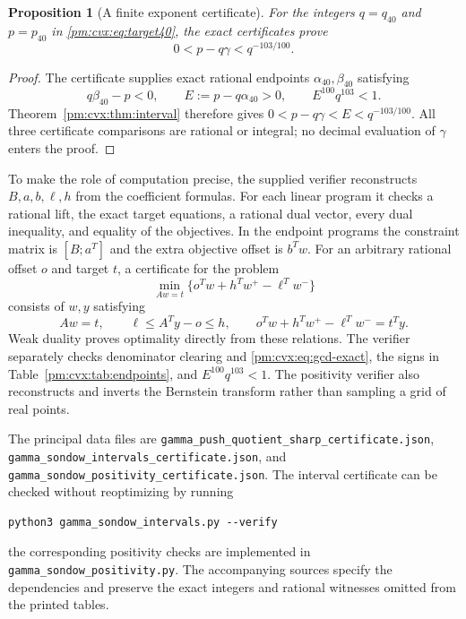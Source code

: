 \documentclass[11pt,a4paper]{article}
\newtheorem{proposition}[theorem]{Proposition}
\theoremstyle{definition}
\theoremstyle{remark}
\numberwithin{equation}{section}
\begin{document}
\begin{proposition}[A finite exponent certificate]
\label{pm:cvx:prop:finite-exponent}
For the integers $q=q_{40}$ and $p=p_{40}$ in
\eqref{pm:cvx:eq:target40}, the exact certificates prove
\begin{equation}\label{pm:cvx:eq:103}
 0<p-q\gamma<q^{-103/100}.
\end{equation}
\end{proposition}
\begin{proof}
The certificate supplies exact rational endpoints
$\alpha_{40},\beta_{40}$ satisfying
\[
 q\beta_{40}-p<0,\qquad
 E:=p-q\alpha_{40}>0,\qquad E^{100}q^{103}<1.
\]
Theorem~\ref{pm:cvx:thm:interval} therefore gives
$0<p-q\gamma<E<q^{-103/100}$.  All three certificate comparisons
are rational or integral; no decimal evaluation of $\gamma$ enters
the proof.
\end{proof}

To make the role of computation precise, the supplied verifier
reconstructs $B,a,b,\ell,h$ from the coefficient formulas.  For each
linear program it checks a rational lift, the exact target equations,
a rational dual vector, every dual inequality, and equality of the
objectives.  In the endpoint programs the constraint matrix is
$[B;a^T]$ and the extra objective offset is $b^Tw$.
For an arbitrary rational offset $o$ and target $t$, a certificate
for the problem
\[
 \min_{Aw=t}\{o^Tw+h^Tw^+-\ell^Tw^-\}
\]
consists of $w,y$ satisfying
\[
 Aw=t,\qquad \ell\le A^Ty-o\le h,\qquad
 o^Tw+h^Tw^+-\ell^Tw^-=t^Ty.
\]
Weak duality proves optimality directly from these relations.
The verifier separately checks denominator clearing and
\eqref{pm:cvx:eq:gcd-exact}, the signs in
Table~\ref{pm:cvx:tab:endpoints}, and $E^{100}q^{103}<1$.
The positivity verifier also reconstructs and inverts the Bernstein
transform rather than sampling a grid of real points.

The principal data files are
\nolinkurl{gamma_push_quotient_sharp_certificate.json},
\nolinkurl{gamma_sondow_intervals_certificate.json}, and
\nolinkurl{gamma_sondow_positivity_certificate.json}.
The interval certificate can be checked without reoptimizing by
running
\begin{verbatim}
python3 gamma_sondow_intervals.py --verify
\end{verbatim}
the corresponding positivity checks are implemented in
\nolinkurl{gamma_sondow_positivity.py}.  The accompanying sources
specify the dependencies and preserve the exact integers and rational
witnesses omitted from the printed tables.
\end{document}
